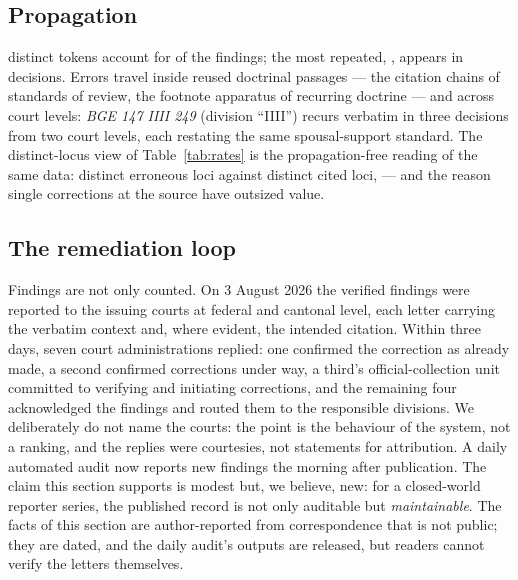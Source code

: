 \documentclass[11pt,a4paper]{article}
\newcommand{\RLetterDate}{3 August 2026}
\newcommand{\RNReplied}{seven}
\newcommand{\RNReplyDays}{three}
\begin{document}
\subsection{Propagation}\label{sec:propagation}

\NRepeatTokens{} distinct tokens account for \NRepeatFindings{} of the
\NFindings{} findings; the most repeated, \emph{\TopToken{}}, appears
in \TopTokenN{} decisions. Errors travel inside reused doctrinal
passages --- the citation chains of standards of review, the footnote
apparatus of recurring doctrine --- and across court levels:
\emph{BGE 147 IIII 249} (division ``IIII'') recurs verbatim in three
decisions from two court levels, each restating the same
spousal-support standard. The distinct-locus view of
Table~\ref{tab:rates} is the propagation-free reading of the same
data: \NDistinctTokens{} distinct erroneous loci against
\NDistinctRefs{} distinct cited loci, \DistinctShare{} --- and the
reason single corrections at the source have outsized value.



\subsection{The remediation loop}\label{sec:campaign}

Findings are not only counted. On \RLetterDate{} the verified findings
were reported to the issuing courts at federal and cantonal level,
each letter carrying the verbatim context and, where evident, the
intended citation. Within \RNReplyDays{} days, \RNReplied{} court
administrations replied: one confirmed the correction as already made,
a second confirmed corrections under way, a third's
official-collection unit committed to verifying and initiating
corrections, and the remaining four acknowledged the findings and
routed them to the responsible divisions. We deliberately do not name
the courts: the point is the behaviour of the system, not a ranking,
and the replies were courtesies, not statements for attribution. A
daily automated audit now reports new findings the morning after
publication. The claim this section supports is modest but, we
believe, new: for a closed-world reporter series, the published record
is not only auditable but \emph{maintainable}. The facts of this
section are author-reported from correspondence that is not public;
they are dated, and the daily audit's outputs are released, but
readers cannot verify the letters themselves.

\end{document}
